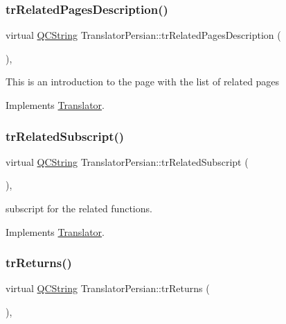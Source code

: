 \subsubsection{\texorpdfstring{trRelatedPagesDescription()}{trRelatedPagesDescription()}}
{\footnotesize\ttfamily virtual \mbox{\hyperlink{class_q_c_string}{Q\+C\+String}} Translator\+Persian\+::tr\+Related\+Pages\+Description (\begin{DoxyParamCaption}{ }\end{DoxyParamCaption})\hspace{0.3cm}{\ttfamily [inline]}, {\ttfamily [virtual]}}

This is an introduction to the page with the list of related pages 

Implements \mbox{\hyperlink{class_translator}{Translator}}.

\mbox{\label{class_translator_persian_a07c7418c5b1f8224d5d8ae10e8e95710}} 
\subsubsection{\texorpdfstring{trRelatedSubscript()}{trRelatedSubscript()}}
{\footnotesize\ttfamily virtual \mbox{\hyperlink{class_q_c_string}{Q\+C\+String}} Translator\+Persian\+::tr\+Related\+Subscript (\begin{DoxyParamCaption}{ }\end{DoxyParamCaption})\hspace{0.3cm}{\ttfamily [inline]}, {\ttfamily [virtual]}}

subscript for the related functions. 

Implements \mbox{\hyperlink{class_translator}{Translator}}.

\mbox{\label{class_translator_persian_a31b062d9d7a4e636d2bb11bb85bc30de}} 
\subsubsection{\texorpdfstring{trReturns()}{trReturns()}}
{\footnotesize\ttfamily virtual \mbox{\hyperlink{class_q_c_string}{Q\+C\+String}} Translator\+Persian\+::tr\+Returns (\begin{DoxyParamCaption}{ }\end{DoxyParamCaption})\hspace{0.3cm}{\ttfamily [inline]}, {\ttfamily [virtual]}}

